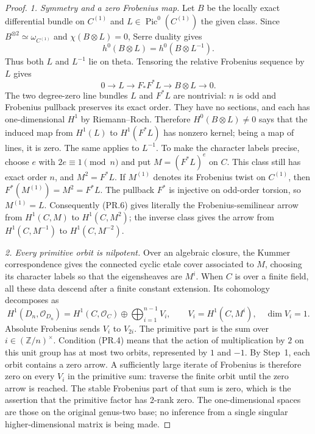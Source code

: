 \begin{proof}
\emph{1. Symmetry and a zero Frobenius map.}
Let $B$ be the locally exact differential bundle on $C^{(1)}$ and
$L\in\operatorname{Pic}^0(C^{(1)})$ the given class. Since
$B^{\otimes2}\simeq\omega_{C^{(1)}}$ and $\chi(B\otimes L)=0$,
Serre duality gives
\[
 h^0(B\otimes L)=h^0(B\otimes L^{-1}).
 \tag{PR.5}
\]
Thus both $L$ and $L^{-1}$ lie on theta. Tensoring the relative
Frobenius sequence by $L$ gives
\[
 0\longrightarrow L\longrightarrow F_*F^*L
       \longrightarrow B\otimes L\longrightarrow0.
 \tag{PR.6}
\]
The two degree-zero line bundles $L$ and $F^*L$ are nontrivial:
$n$ is odd and Frobenius pullback preserves its exact order.
They have no sections, and each has one-dimensional $H^1$ by
Riemann--Roch. Therefore $H^0(B\otimes L)\ne0$ says that the
induced map from $H^1(L)$ to $H^1(F^*L)$ has nonzero kernel;
being a map of lines, it is zero. The same applies to $L^{-1}$.
To make the character labels precise, choose $e$ with $2e\equiv1
\pmod n$ and put $M=(F^*L)^e$ on $C$. This class still has exact
order $n$, and $M^2=F^*L$. If $M^{(1)}$ denotes its Frobenius
twist on $C^{(1)}$, then $F^*(M^{(1)})=M^2=F^*L$.
The pullback $F^*$ is injective on odd-order torsion, so
$M^{(1)}=L$. Consequently (PR.6) gives literally the
Frobenius-semilinear arrow from $H^1(C,M)$ to $H^1(C,M^2)$;
the inverse class gives the arrow from $H^1(C,M^{-1})$ to
$H^1(C,M^{-2})$.

\emph{2. Every primitive orbit is nilpotent.}
Over an algebraic closure, the Kummer correspondence gives the
connected cyclic etale cover associated to $M$, choosing its
character labels so that the eigensheaves are $M^i$.
When $C$ is over a finite field, all these data descend after a
finite constant extension. Its cohomology decomposes as
\[
 H^1(D_n,\mathcal O_{D_n})=
   H^1(C,\mathcal O_C)\oplus
   \bigoplus_{i=1}^{n-1} V_i,\qquad
   V_i=H^1(C,M^i),\quad \dim V_i=1.
 \tag{PR.7}
\]
Absolute Frobenius sends $V_i$ to $V_{2i}$. The primitive part is
the sum over $i\in(\mathbb Z/n)^\times$.
Condition (PR.4) means that the action of multiplication by $2$
on this unit group has at most two orbits, represented by $1$ and
$-1$. By Step~1, each orbit contains a zero arrow. A sufficiently
large iterate of Frobenius is therefore zero on every $V_i$ in
the primitive sum: traverse the finite orbit until the zero arrow
is reached. The stable Frobenius part of that sum is zero, which
is the assertion that the primitive factor has $2$-rank zero.
The one-dimensional spaces are those on the original genus-two
base; no inference from a single singular higher-dimensional
matrix is being made.


\end{proof}
